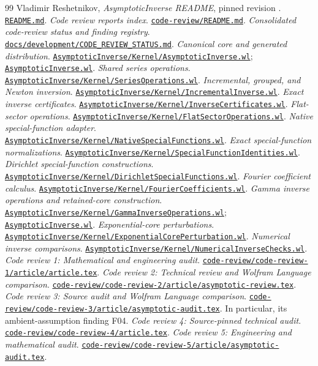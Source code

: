 \documentclass[11pt,a4paper]{article}
\newcommand{\code}[1]{\texttt{\detokenize{#1}}}
\newcommand{\repo}[1]{\href{https://github.com/VladimirReshetnikov/Asymptotic/blob/921387e5ba1239bfda96e63e64e89bf63d9c41e6/#1}{\nolinkurl{#1}}}
\begin{document}
\clearpage
\begin{thebibliography}{99}
\small
{} Vladimir Reshetnikov, \emph{AsymptoticInverse README}, pinned revision \code{921387e}. \repo{README.md}.
 \emph{Code review reports index}. \repo{code-review/README.md}.
 \emph{Consolidated code-review status and finding registry}. \repo{docs/development/CODE_REVIEW_STATUS.md}.
 \emph{Canonical core and generated distribution}. \repo{AsymptoticInverse/Kernel/AsymptoticInverse.wl}; \repo{AsymptoticInverse.wl}.
 \emph{Shared series operations}. \repo{AsymptoticInverse/Kernel/SeriesOperations.wl}.
 \emph{Incremental, grouped, and Newton inversion}. \repo{AsymptoticInverse/Kernel/IncrementalInverse.wl}.
 \emph{Exact inverse certificates}. \repo{AsymptoticInverse/Kernel/InverseCertificates.wl}.
 \emph{Flat-sector operations}. \repo{AsymptoticInverse/Kernel/FlatSectorOperations.wl}.
 \emph{Native special-function adapter}. \repo{AsymptoticInverse/Kernel/NativeSpecialFunctions.wl}.
 \emph{Exact special-function normalizations}. \repo{AsymptoticInverse/Kernel/SpecialFunctionIdentities.wl}.
 \emph{Dirichlet special-function constructions}. \repo{AsymptoticInverse/Kernel/DirichletSpecialFunctions.wl}.
 \emph{Fourier coefficient calculus}. \repo{AsymptoticInverse/Kernel/FourierCoefficients.wl}.
 \emph{Gamma inverse operations and retained-core construction}. \repo{AsymptoticInverse/Kernel/GammaInverseOperations.wl}; \repo{AsymptoticInverse.wl}.
 \emph{Exponential-core perturbations}. \repo{AsymptoticInverse/Kernel/ExponentialCorePerturbation.wl}.
 \emph{Numerical inverse comparisons}. \repo{AsymptoticInverse/Kernel/NumericalInverseChecks.wl}.
 \emph{Code review 1: Mathematical and engineering audit}. \repo{code-review/code-review-1/article/article.tex}.
 \emph{Code review 2: Technical review and Wolfram Language comparison}. \repo{code-review/code-review-2/article/asymptotic-review.tex}.
 \emph{Code review 3: Source audit and Wolfram Language comparison}. \repo{code-review/code-review-3/article/asymptotic-audit.tex}. In particular, its ambient-assumption finding F04.
 \emph{Code review 4: Source-pinned technical audit}. \repo{code-review/code-review-4/article.tex}.
 \emph{Code review 5: Engineering and mathematical audit}. \repo{code-review/code-review-5/article/asymptotic-audit.tex}.

\end{thebibliography}
\end{document}
